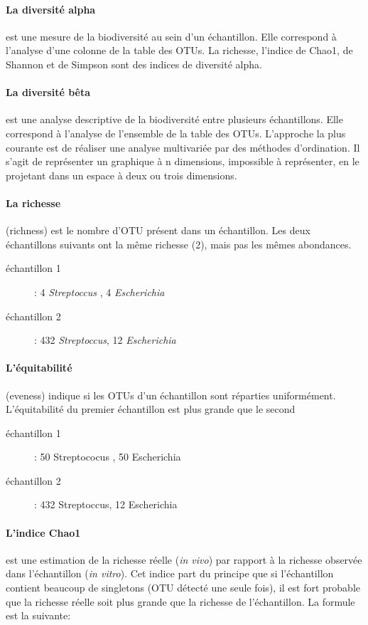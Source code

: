 \documentclass[12pt,a4paper]{article}
\begin{document}
\paragraph{La diversité alpha} est une mesure de la biodiversité au sein d’un échantillon. Elle correspond à l'analyse d'une colonne de la table des OTUs. La richesse, l'indice de Chao1, de Shannon et de Simpson sont des indices de diversité alpha.

\paragraph{La diversité bêta} est une analyse descriptive de la biodiversité entre plusieurs échantillons. Elle correspond à l'analyse de l’ensemble de la table des OTUs. L’approche la plus courante est de réaliser une analyse multivariée par des méthodes d’ordination. Il s’agit de représenter un graphique à n dimensions, impossible à représenter, en le projetant dans un espace à deux ou trois dimensions.

\paragraph{La richesse}(richness) est le nombre d'OTU présent dans un échantillon. Les deux échantillons suivants ont la même richesse (2), mais pas les mêmes abondances.

\begin{description}
\item[échantillon 1]  : 4 \textit{Streptoccus} , 4 \textit{Escherichia}
\item[échantillon 2]  : 432 \textit{Streptoccus}, 12 \textit{Escherichia}
\end{description}

\paragraph{L'équitabilité}(eveness) indique si les OTUs d’un échantillon sont réparties uniformément.
L'équitabilité du premier échantillon est plus grande que le second

\begin{description}
\item[échantillon 1]  : 50 Streptococus , 50 Escherichia
\item[échantillon 2]  : 432 Streptoccus, 12 Escherichia
\end{description}


\paragraph{L'indice Chao1}est une estimation de la richesse réelle (\textit{in vivo}) par rapport à la richesse observée dans l'échantillon (\textit{in vitro}). Cet indice part du principe que si l’échantillon contient beaucoup de singletons (OTU détecté une seule fois), il est fort probable que la richesse réelle soit plus grande que la richesse de l’échantillon. La formule est la suivante:
\end{document}
